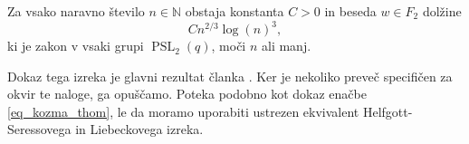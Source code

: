     \begin{izrek}
    \label{izr_bradford_thom}
    Za vsako naravno število $n \in \mathbb{N}$ obstaja konstanta $C > 0$ in beseda $w \in F_2$ dolžine \begin{equation*}
        C n^{2 / 3} {\log(n)}^3,
        \end{equation*}  
        ki je zakon v vsaki grupi $\operatorname{PSL}_2(q)$, moči $n$ ali manj.
    \end{izrek}
    Dokaz tega izreka je glavni rezultat članka \cite{Bradford_Thom_2017}. Ker je nekoliko preveč specifičen za okvir te naloge, ga opuščamo.
    Poteka podobno kot dokaz enačbe \ref{eq_kozma_thom}, le da moramo uporabiti ustrezen ekvivalent Helfgott-Seressovega in Liebeckovega izreka. 

    

\